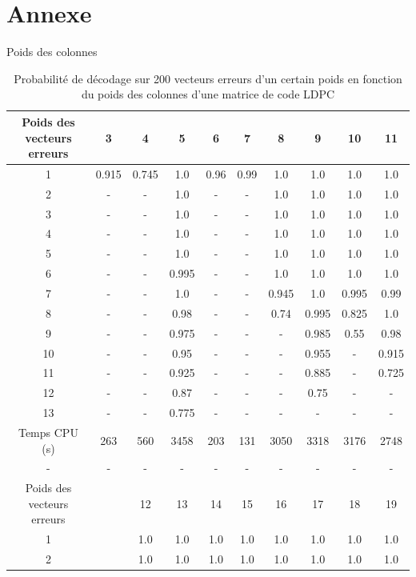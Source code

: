 \documentclass[french,nochapter,11pt]{rapportUB}
\begin{document}
\section{Annexe}
\begin{table}[htbp]
  \centering
  \caption{Probabilité de décodage sur 200 vecteurs erreurs d'un certain poids en fonction du poids des colonnes d'une matrice de code LDPC}
  \label{table:res1}
  \vspace{0.3cm}\hspace{4.5cm} Poids des colonnes\vspace{0.1cm}
  \begin{tabular}{|c|c|c|c|c|c|c|c|c|c|}
    \hline
    Poids des vecteurs erreurs &3 &4 &5 &6 &7 &8 &9 &10 &11 \\
    \hline
    1	&0.915	&0.745	&1.0	&0.96	&0.99	&1.0	&1.0	&1.0	&1.0 \\
    \hline
    2	&-	&-	&1.0	&-	&-	&1.0	&1.0	&1.0	&1.0 \\
    \hline
    3	&-	&-	&1.0	&-	&-	&1.0	&1.0	&1.0	&1.0 \\
    \hline
    4	&-	&-	&1.0	&-	&-	&1.0	&1.0	&1.0	&1.0 \\
    \hline
    5	&-	&-	&1.0	&-	&-	&1.0	&1.0	&1.0	&1.0 \\
    \hline
    6	&-	&-	&0.995	&-	&-	&1.0	&1.0	&1.0	&1.0 \\
    \hline
    7	&-	&-	&1.0	&-	&-	&0.945	&1.0	&0.995	&0.99\\
    \hline
    8	&-	&-	&0.98	&-	&-	&0.74	&0.995	&0.825	&1.0 \\
    \hline
    9	&-	&-	&0.975	&-	&-	&-	&0.985	&0.55	&0.98 \\
    \hline
    10	&-	&-	&0.95	&-	&-	&-	&0.955	&-	&0.915 \\
    \hline
    11 	&-	&-	&0.925	&-	&-	&-	&0.885	&-	&0.725 \\
    \hline
    12	&-	&-	&0.87	&-	&-	&-	&0.75	&-	&- \\
    \hline
    13	&-	&-	&0.775	&-	&-	&-	&-	&-	&- \\
    \hline
    Temps CPU (s) &263	&560	&3458	&203	&131	&3050	&3318	&3176	&2748\\
    \hline
    - &- &- &- &- &- &- &- &- &-\\
    \hline
    Poids des vecteurs erreurs &\phantom &12 &13 &14 &15 &16 &17 &18 &19 \\
    \hline
    1 &\phantom &1.0	&1.0	&1.0	&1.0	&1.0	&1.0	&1.0	&1.0 \\
    \hline
    2 &\phantom&1.0	&1.0	&1.0 &1.0	&1.0	&1.0	&1.0	&1.0\\

\end{tabular}
\end{table}
\end{document}
